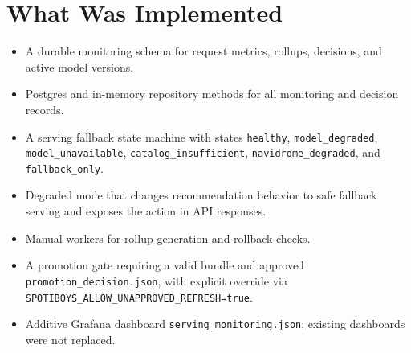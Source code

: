 \documentclass[11pt]{article}
\begin{document}
\section*{What Was Implemented}
\begin{itemize}[leftmargin=*]
  \item A durable monitoring schema for request metrics, rollups, decisions, and active model versions.
  \item Postgres and in-memory repository methods for all monitoring and decision records.
  \item A serving fallback state machine with states \texttt{healthy}, \texttt{model\_degraded}, \texttt{model\_unavailable}, \texttt{catalog\_insufficient}, \texttt{navidrome\_degraded}, and \texttt{fallback\_only}.
  \item Degraded mode that changes recommendation behavior to safe fallback serving and exposes the action in API responses.
  \item Manual workers for rollup generation and rollback checks.
  \item A promotion gate requiring a valid bundle and approved \texttt{promotion\_decision.json}, with explicit override via \texttt{SPOTIBOYS\_ALLOW\_UNAPPROVED\_REFRESH=true}.
  \item Additive Grafana dashboard \texttt{serving\_monitoring.json}; existing dashboards were not replaced.
\end{itemize}
\end{document}
